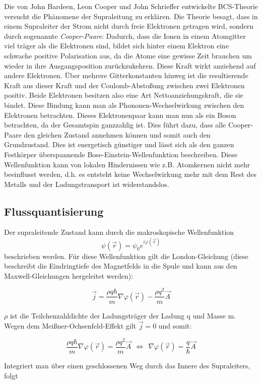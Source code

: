 Die von John Bardeen, Leon Cooper und John Schrieffer entwickelte BCS-Theorie versucht die Phänomene der Supraleitung zu erklären. Die Theorie besagt, dass in einem Supraleiter der Strom nicht durch freie Elektronen getragen wird, sondern durch sogenannte \emph{Cooper-Paare}: Dadurch, dass die Ionen in einem Atomgitter viel träger als die Elektronen sind, bildet sich hinter einem Elektron eine schwache positive Polarisation aus, da die Atome eine gewisse Zeit brauchen um wieder in ihre Ausgangsposition zurückzukehren. Diese Kraft wirkt anziehend auf andere Elektronen. Über mehrere Gitterkonstanten hinweg ist die resultierende Kraft aus dieser Kraft und der Coulomb-Abstoßung zwischen zwei Elektronen positiv. Beide Elektronen besitzen also eine Art Nettoanziehungskraft, die sie bindet. Diese Bindung kann man als Phononen-Wechselwirkung zwischen den Elektronen betrachten. Dieses Elektronenpaar kann man nun als ein Boson betrachten, da der Gesamtspin ganzzahlig ist. Dies führt dazu, dass alle Cooper-Paare den gleichen Zustand annehmen können und somit auch den Grundzustand. Dies ist energetisch günstiger und lässt sich als den ganzen Festkörper überspannende Bose-Einstein-Wellenfunktion beschreiben. Diese Wellenfunktion kann von lokalen Hindernissen wie z.B. Atomkernen nicht mehr beeinflusst werden, d.h. es entsteht keine Wechselwirkung mehr mit dem Rest des Metalls und der Ladungstransport ist widerstandslos.

\subsection{Flussquantisierung}

Der supraleitende Zustand kann durch die makroskopische Wellenfunktion $$\psi(\vec r) = \psi_0e^{i\varphi(\vec r)}$$ beschrieben werden. Für diese Wellenfunktion gilt die London-Gleichung (diese beschreibt die Eindringtiefe des Magnetfelds in die Spule und kann aus den Maxwell-Gleichungen hergeleitet werden):

$$\vec j = \frac{\rho q\hbar}{m}\nabla \varphi(\vec r) - \frac{\rho q^2}{m}\vec A$$ 

$\rho$ ist die Teilchenzahldichte der Ladungsträger der Ladung q und Masse m. Wegen dem Meißner-Ochsenfeld-Effekt gilt $\vec j = 0$ und somit:

$$ \frac{\rho q\hbar}{m}\nabla \varphi(\vec r) = \frac{\rho q^2}{m}\vec A \ \ \Leftrightarrow \ \ \nabla\varphi(\vec r) = \frac{q}{\hbar}\vec A$$

Integriert man über einen geschlossenen Weg durch das Innere des Supraleiters, folgt

